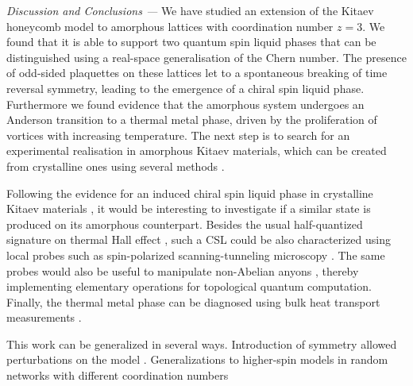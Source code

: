 \documentclass[%
 reprint,
superscriptaddress,
 amsmath,amssymb,
aps,
]{revtex4-2}
\begin{document}
{\it Discussion and Conclusions --- }
We have studied an extension of the Kitaev honeycomb model to amorphous lattices with coordination number $z= 3$. We found that it is able to support two quantum spin liquid phases that can be distinguished using a real-space generalisation of the Chern number. The presence of odd-sided plaquettes on these lattices let to a spontaneous breaking of time reversal symmetry, leading to the emergence of a chiral spin liquid phase. Furthermore we found evidence that the amorphous system undergoes an Anderson transition to a thermal metal phase, driven by the proliferation of vortices with increasing temperature. The next step is to search for an experimental realisation in amorphous Kitaev materials, which can be created from crystalline ones using several methods \cite{Weaire1976,Petrakovski1981,Kaneyoshi2018}. \par
Following the evidence for an induced chiral spin liquid phase in crystalline Kitaev materials \cite{Kasahara2018,Yokoi2021,Yamashita2020,Bruin2022}, it would be interesting to investigate if a similar state is produced on its amorphous counterpart. Besides the usual half-quantized signature on thermal Hall effect \cite{Kasahara2018,Yokoi2021,Yamashita2020,Bruin2022}, such a CSL could be also characterized using local probes such as spin-polarized scanning-tunneling microscopy \cite{Feldmeier2020,Konig2020,Udagawa2021}. The same probes would also be useful to manipulate non-Abelian anyons  \cite{Pereira2020}, thereby implementing elementary operations for topological quantum computation. Finally, the thermal metal phase can be diagnosed using bulk heat transport measurements \cite{Beenakker2013}.\par     
This work can be generalized in several ways. Introduction of symmetry allowed perturbations on the model \cite{Rau2014,Chaloupka2010,Chaloupka2013,Chaloupka2015,Winter2016}. Generalizations to higher-spin models in random networks with different coordination numbers \cite{Baskaran2008,Yao2009,Nussinov2009,Yao2011,Chua2011,Natori2020,Chulliparambil2020,Chulliparambil2021,Seifert2020,WangHaoranPRB2021,Wu2009}


\end{document}
